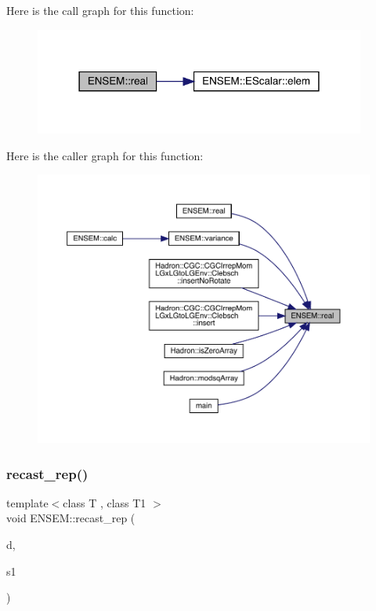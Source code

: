 Here is the call graph for this function\+:
\nopagebreak
\begin{figure}[H]
\begin{center}
\leavevmode
\includegraphics[width=309pt]{d4/dca/group__escalar_gae1f319d978abc1631bd68382787544aa_cgraph}
\end{center}
\end{figure}
Here is the caller graph for this function\+:
\nopagebreak
\begin{figure}[H]
\begin{center}
\leavevmode
\includegraphics[width=350pt]{d4/dca/group__escalar_gae1f319d978abc1631bd68382787544aa_icgraph}
\end{center}
\end{figure}
\mbox{\label{group__escalar_ga49ac1b22b18f5dd54cdf91fbf9a4e3b2}} 
\subsubsection{\texorpdfstring{recast\_rep()}{recast\_rep()}}
{\footnotesize\ttfamily template$<$class T , class T1 $>$ \\
void E\+N\+S\+E\+M\+::recast\+\_\+rep (\begin{DoxyParamCaption}\item[{\mbox{\hyperlink{classENSEM_1_1EScalar}{E\+Scalar}}$<$ T $>$ \&}]{d,  }\item[{const \mbox{\hyperlink{classENSEM_1_1EScalar}{E\+Scalar}}$<$ T1 $>$ \&}]{s1 }\end{DoxyParamCaption})\hspace{0.3cm}{\ttfamily [inline]}}



